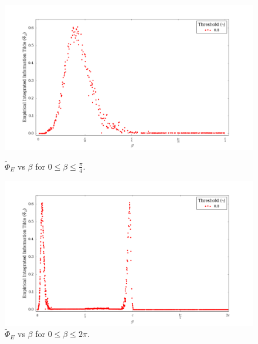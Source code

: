 \documentclass[a4paper,11pt]{article}
\begin{document}
\begin{figure}[H] 
	\label{fig:phi-tilde-vs-beta-all} 
	\begin{minipage}[b]{0.5\linewidth}
		\begin{center}
		\includegraphics[scale = 0.2]{figures/phi_tilde_vs_beta_orig}
		\caption{
				$\widetilde{\Phi}_E$ vs $\beta$ for $0 \leq \beta \leq \frac{\pi}{4}$.
			\label{fig:phi-tilde-vs-beta-orig}
		}
		\end{center}
		\vspace{4ex}
	\end{minipage}
	\begin{minipage}[b]{0.5\linewidth}
		\begin{center}
		\includegraphics[scale = 0.2]{figures/phi_tilde_vs_beta_ext}
		\caption{
			$\widetilde{\Phi}_E$ vs $\beta$ for $0 \leq \beta \leq 2\pi$.
			\label{fig:phi-tilde-vs-beta-ext}
		}
		\end{center}
		\vspace{4ex}
	\end{minipage}
	\begin{minipage}[b]{0.5\linewidth}

\end{minipage}
\end{figure}
\end{document}
